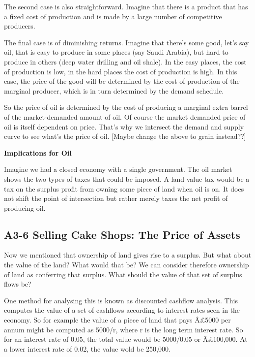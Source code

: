 \documentclass[]{tufte-handout}
\begin{document}
The second case is also straightforward. Imagine that there is a product
that has a fixed cost of production and is made by a large number of
competitive producers.

The final case is of diminishing returns. Imagine that there's some
good, let's say oil, that is easy to produce in some places (say Saudi
Arabia), but hard to produce in others (deep water drilling and oil
shale). In the easy places, the cost of production is low, in the hard
places the cost of production is high. In this case, the price of the
good will be determined by the cost of production of the marginal
producer, which is in turn determined by the demand schedule.

So the price of oil is determined by the cost of producing a marginal
extra barrel of the market-demanded amount of oil. Of course the market
demanded price of oil is itself dependent on price. That's why we
intersect the demand and supply curve to see what's the price of oil.
{[}Maybe change the above to grain instead??{]}

\textbf{Implications for Oil}

Imagine we had a closed economy with a single government. The oil market
shows the two types of taxes that could be imposed. A land value tax
would be a tax on the surplus profit from owning some piece of land when
oil is on. It does not shift the point of intersection but rather merely
taxes the net profit of producing oil.

\hypertarget{a3-6-selling-cake-shops-the-price-of-assets}{%
\subsection{A3-6 Selling Cake Shops: The Price of
Assets}\label{a3-6-selling-cake-shops-the-price-of-assets}}

Now we mentioned that ownership of land gives rise to a surplus. But
what about the value of the land? What would that be? We can consider
therefore ownership of land as conferring that surplus. What should the
value of that set of surplus flows be?

One method for analysing this is known as discounted cashflow analysis.
This computes the value of a set of cashflows according to interest
rates seen in the economy. So for example the value of a piece of land
that pays Â£5000 per annum might be computed as 5000/r, where r is the
long term interest rate. So for an interest rate of 0.05, the total
value would be 5000/0.05 or Â£100,000. At a lower interest rate of 0.02,
the value wold be 250,000.
\end{document}
